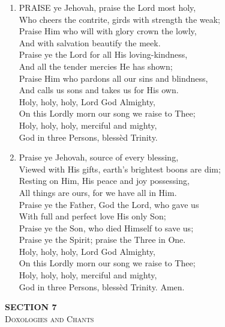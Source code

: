 \documentclass[11pt,a4paper]{article}
\begin{document}
\begin{enumerate}
    \item PRAISE ye Jehovah, praise the Lord most holy, \\
        Who cheers the contrite, girds with strength the weak; \\
        Praise Him who will with glory crown the lowly, \\
        And with salvation beautify the meek. \\
        Praise ye the Lord for all His loving-kindness, \\
        And all the tender mercies He has shown; \\
        Praise Him who pardons all our sins and blindness, \\
        And calls us sons and takes us for His own. \\
        Holy, holy, holy, Lord God Almighty, \\
        On this Lordly morn our song we raise to Thee; \\
        Holy, holy, holy, merciful and mighty, \\
        God in three Persons, bless\`ed Trinity.

    \item Praise ye Jehovah, source of every blessing, \\
        Viewed with His gifts, earth's brightest boons are dim; \\
        Resting on Him, His peace and joy possessing, \\
        All things are ours, for we have all in Him. \\
        Praise ye the Father, God the Lord, who gave us \\
        With full and perfect love His only Son; \\
        Praise ye the Son, who died Himself to save us; \\
        Praise ye the Spirit; praise the Three in One. \\
        Holy, holy, holy, Lord God Almighty, \\
        On this Lordly morn our song we raise to Thee; \\
        Holy, holy, holy, merciful and mighty, \\
        God in three Persons, bless\`ed Trinity. Amen.

\end{enumerate}

\newpage
\thispagestyle{empty}
\vspace*{3.5cm}
\begin{center}
    {\LARGE \textbf{SECTION 7}}\\[0.8em]
    {\Large \textsc{Doxologies and Chants}}
\end{center}
\vspace{3.5cm}
\end{document}
